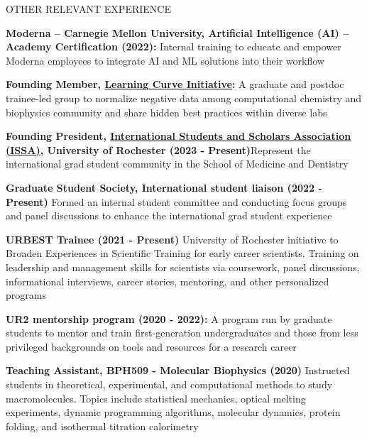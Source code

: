 \documentclass{resume} %
\begin{document}

\begin{rSection}{OTHER RELEVANT EXPERIENCE}
   \vspace{-1.25em}
   \item \textbf{Moderna – Carnegie Mellon University, Artificial Intelligence (AI) – Academy Certification (2022):} {
      Internal training to educate and empower Moderna employees to integrate AI and ML solutions into their workflow}
   \item \textbf{Founding Member,  \href{https://learning-curve-initiative.github.io/about/}{Learning Curve Initiative}:} {A graduate and postdoc trainee-led group to normalize negative data among computational chemistry and biophysics community and share hidden best practices within diverse labs}
   \item \textbf{Founding President, \href{https://ccc.rochester.edu/issa/home/}{International Students and Scholars Association (ISSA)}, University of Rochester (2023 - Present)}{Represent the international grad student community in the School of Medicine and Dentistry}
   \item \textbf{Graduate Student Society, International student liaison (2022 - Present)} {Formed an internal student committee and conducting focus groups and panel discussions to enhance the international grad student experience}
   \item \textbf{URBEST Trainee (2021 - Present)} {University of Rochester initiative to Broaden Experiences in Scientific Training for early career scientists. Training on leadership and management skills for scientists via coursework, panel discussions, informational interviews, career stories, mentoring, and other personalized programs}
   \item \textbf{UR2 mentorship program (2020 - 2022):} {A program run by graduate students to mentor and train first-generation undergraduates and those from less privileged backgrounds on tools and resources for a research career}
   \item \textbf{Teaching Assistant, BPH509 - Molecular Biophysics (2020)} {Instructed students in theoretical, experimental, and computational methods to study macromolecules. Topics include statistical mechanics, optical melting experiments, dynamic
      programming algorithms, molecular dynamics, protein folding, and isothermal titration calorimetry
}
\end{rSection}
\end{document}
